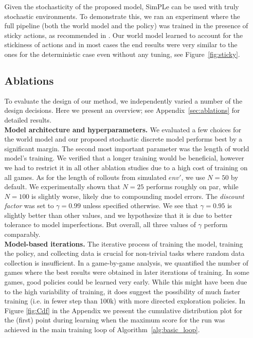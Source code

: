 Given the stochasticity of the proposed model, SimPLe can be used with truly stochastic environments. To demonstrate this, we ran an experiment where the full pipeline (both the world model and the policy) was trained in the presence of sticky actions, as recommended in \cite[Section 5]{ale2}. Our world model learned to account for the stickiness of actions and in most cases the end results were very similar to the ones for the deterministic case even without any tuning, see Figure~\ref{fig:sticky}.

\subsection{Ablations}\label{subabl}
To evaluate the design of our method, we independently varied a number of the design decisions. Here we present an overview; see Appendix~\ref{sec:ablations} for detailed results.
\vspace{0.1cm}\\\textbf{Model architecture and hyperparameters.}
We evaluated a few choices for the world model and our proposed stochastic discrete model performs best by a significant margin.
The second most important parameter was the length of world model's training. We verified that a longer training would be beneficial,
however we had to restrict it in all other ablation studies due to a high cost of training on all games.
As for the length of rollouts from simulated $env'$, we use $N=50$ by default. We experimentally shown that $N=25$ performs roughly on par, while $N=100$ is slightly worse, likely due to compounding model errors.
The \emph{discount factor} was set to $\gamma=0.99$ unless specified otherwise.  We see that $\gamma=0.95$ is slightly better than other values, and we hypothesize that it is due to better tolerance to model imperfections. But overall, all three values of $\gamma$ perform comparably.
\vspace{0.1cm}\\\textbf{Model-based iterations.}
The iterative process of training the model, training the policy, and collecting data is crucial for non-trivial tasks where random data collection is insufficient. In a game-by-game analysis, we quantified the number of games where the best results were obtained in later iterations of training. In some games, good policies could be learned very early. While this might have been due to the high variability of training, it does suggest the possibility of much faster training (i.e. in fewer step than 100k) with more directed exploration policies. In Figure \ref{fig:Cdf} in the Appendix we present the cumulative distribution plot for the (first) point during learning when the maximum score for the run was achieved in the main training loop of Algorithm~\ref{alg:basic_loop}.

